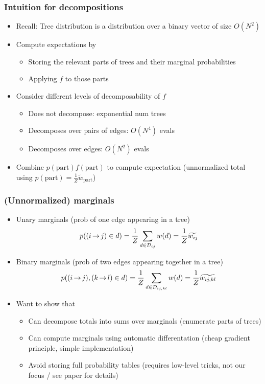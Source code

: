 \documentclass{beamer}
\begin{document}
\begin{frame}
\frametitle{Intuition for decompositions}
\begin{itemize}
\item Recall: Tree distribution is a distribution over a binary vector of size $O(N^2)$
\item Compute expectations by
    \begin{itemize}
        \item Storing the relevant parts of trees and their marginal probabilities
        \item Applying $f$ to those parts
    \end{itemize}
\item Consider different levels of decomposability of $f$
    \begin{itemize}
    \item Does not decompose: exponential num trees
    \item Decomposes over pairs of edges: $O(N^4)$ evals
    \item Decomposes over edges: $O(N^2)$ evals
    \end{itemize}
\item Combine $p(\textrm{part})f(\textrm{part})$ to compute expectation
    (unnormalized total using $p(\textrm{part}) = \frac{1}{Z}\tilde{w}_{\textrm{part}}$)
\end{itemize}
\end{frame}

\begin{frame}
\frametitle{(Unnormalized) marginals}
\begin{itemize}
\item Unary marginals (prob of one edge appearing in a tree)
    $$p({(i\,{\rightarrow}\,j)} \in d) = \frac{1}{Z}\sum_{{d}\in{\mathcal{D}_{ij}}}{w({d})}
    = \frac{1}{Z}{\widetilde{w_{ij}}}$$
\item Binary marginals (prob of two edges appearing together in a tree)
    $$p({(i\,{\rightarrow}\,j)},{(k\,{\rightarrow}\,l)} \in d) =  \frac{1}{Z}\sum_{{d}\in{\mathcal{D}_{ij,kl}}}{w({d})}
    = \frac{1}{Z}{\widetilde{w_{ij,kl}}}$$

\item Want to show that
    \begin{itemize}
    \item Can decompose totals into sums over marginals (enumerate parts of trees)
    \item Can compute marginals using automatic differentation (cheap gradient principle,
        simple implementation)
    \item Avoid storing full probability tables (requires low-level tricks, not our focus
        / see paper for details)
    \end{itemize}
\end{itemize}
\end{frame}
\end{document}
